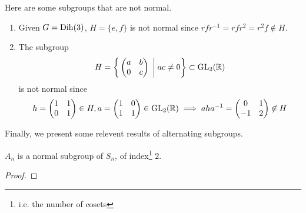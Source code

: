   \begin{example}
    Here are some subgroups that are not normal. 
    \begin{enumerate}
      \item Given $G = \operatorname{Dih}(3)$, $H = \{e, f\}$ is not normal since $rf r^{-1} = r f r^2 = r^2 f \not\in H$. 
      \item The subgroup 
      \begin{equation}
        H = \bigg\{ \begin{pmatrix} a & b \\ 0 & c \end{pmatrix} \; \bigg| \; ac \neq 0 \bigg\} \subset \operatorname{GL}_2 (\mathbb{R})
      \end{equation} 
      is not normal since 
      \begin{equation}
        h = \begin{pmatrix} 1 & 1 \\ 0 & 1 \end{pmatrix} \in H , a = \begin{pmatrix} 1 & 0  \\ 1 & 1 \end{pmatrix} \in \operatorname{GL}_2 (\mathbb{R}) \implies a h a^{-1} = \begin{pmatrix} 0 & 1 \\ -1 & 2 \end{pmatrix} \not\in H
      \end{equation}
    \end{enumerate}
  \end{example}

  Finally, we present some relevent results of alternating subgroups. 

  \begin{theorem}
    $A_n$ is a normal subgroup of $S_n$, of index\footnote{i.e. the number of cosets} $2$. 
  \end{theorem}
  \begin{proof}
    
  \end{proof} 

